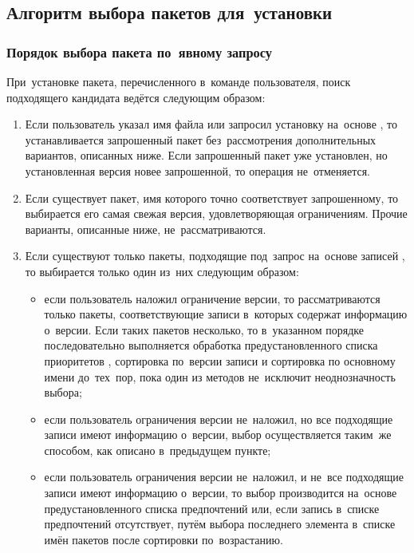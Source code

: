 \subsection{Алгоритм выбора пакетов для~установки}

\subsubsection{Порядок выбора пакета по~явному запросу}

При~установке пакета, перечисленного в~команде пользователя, поиск подходящего кандидата ведётся следующим образом:

\begin{enumerate}

\item {
Если пользователь указал имя файла или запросил установку на~основе ,
то устанавливается запрошенный пакет без~рассмотрения дополнительных вариантов, описанных ниже.
Если запрошенный пакет уже установлен, но установленная версия новее запрошенной,
то операция не~отменяется.
}

\item {
Если существует пакет, имя которого точно соответствует запрошенному, то выбирается его самая свежая версия, удовлетворяющая ограничениям. 
Прочие варианты, описанные ниже, не~рассматриваются.
}

\item {
Если существуют только пакеты, подходящие под~запрос на~основе записей ,
то выбирается только один из~них следующим образом:
}

\begin{itemize}

\item {
если пользователь наложил ограничение версии, то рассматриваются только пакеты,
соответствующие записи \provides в~которых содержат информацию о~версии.
Если таких пакетов несколько, то в~указанном порядке последовательно выполняется обработка предустановленного списка приоритетов \provides, %
сортировка по~версии записи \provides и сортировка по основному имени до~тех~пор, пока один из методов не~исключит неоднозначность выбора;
}

\item {
если пользователь ограничения версии не~наложил, но все подходящие записи \provides имеют информацию о~версии,
выбор осуществляется таким~же способом, как описано в~предыдущем пункте;
}

\item {
если пользователь ограничения версии не~наложил, и не~все подходящие записи \provides имеют информацию о~версии,
то выбор производится на~основе предустановленного списка предпочтений или, 
если запись в~списке предпочтений отсутствует, путём выбора последнего элемента в~списке имён пакетов после сортировки по~возрастанию.
}

\end{itemize}
\end{enumerate}

